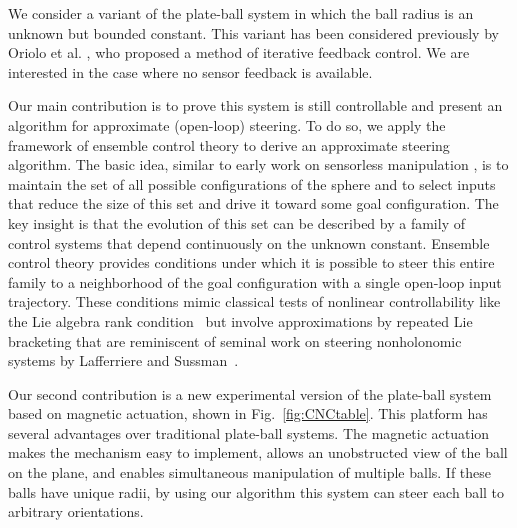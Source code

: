 \documentclass[letter paper, 10pt, conference]{ieeeconf}
\begin{document}
 We consider a variant of the plate-ball system in which the ball radius is an unknown but bounded constant. This variant has been considered previously by Oriolo et al. \cite{Oriolo2005}, who proposed a method of iterative feedback control. We are interested in the case where no sensor feedback is available.
 
 Our main contribution is to prove this system is still controllable and present an algorithm for approximate (open-loop) steering.  To do so, we apply the framework of ensemble control theory \cite{Brockett1999,Li2009,Li2011,Becker2012} to derive an approximate  %
steering algorithm. %
The basic idea, similar to early work on sensorless manipulation \cite{Erdmann1988}, is to maintain the set of all possible configurations of the sphere and to select inputs that reduce the size of this set and drive it toward some goal configuration. The key insight is that the evolution of this set can be described by a family of control systems that depend continuously on the unknown constant. Ensemble control theory provides conditions under which it is possible to steer this entire family to a neighborhood of the goal configuration with a single open-loop input trajectory. These conditions mimic classical tests of nonlinear controllability like
the Lie algebra rank condition~\cite{Sussmann1972}
but involve approximations by repeated Lie bracketing that are reminiscent of seminal work on steering nonholonomic systems by Lafferriere and Sussman~\cite{Lafferriere1993}.

Our second contribution is a new experimental version of the plate-ball system based on magnetic actuation, shown in Fig.~\ref{fig:CNCtable}.  This platform has several advantages over traditional plate-ball systems.  The magnetic actuation makes the mechanism easy to implement, allows an unobstructed view of the ball on the plane, and enables simultaneous manipulation of multiple balls.  If these balls have unique radii, by using our algorithm this system can steer each ball to arbitrary orientations.
\end{document}
